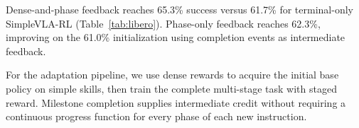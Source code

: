 Dense-and-phase feedback reaches 65.3\% success versus 61.7\% for terminal-only SimpleVLA-RL (Table~\ref{tab:libero}). Phase-only feedback reaches 62.3\%, improving on the 61.0\% initialization using completion events as intermediate feedback.

For the adaptation pipeline, we use dense rewards to acquire the initial base policy on simple skills, then train the complete multi-stage task with staged reward. Milestone completion supplies intermediate credit without requiring a continuous progress function for every phase of each new instruction.


